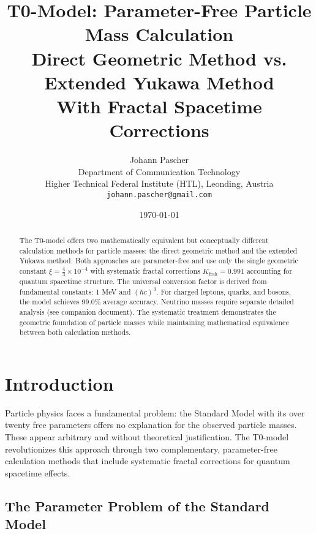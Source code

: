 \documentclass[12pt,a4paper]{article}
\newcommand{\xipar}{\xi}
\begin{document}
	
	\title{T0-Model: Parameter-Free Particle Mass Calculation \\
		\large Direct Geometric Method vs. Extended Yukawa Method \\
		\large With Fractal Spacetime Corrections}
	\author{Johann Pascher\\
		Department of Communication Technology\\
		Higher Technical Federal Institute (HTL), Leonding, Austria\\
		\texttt{johann.pascher@gmail.com}}
	\date{\today}
	
	\maketitle
	
	\begin{abstract}
		The T0-model offers two mathematically equivalent but conceptually different calculation methods for particle masses: the direct geometric method and the extended Yukawa method. Both approaches are parameter-free and use only the single geometric constant $\xipar = \frac{4}{3} \times 10^{-4}$ with systematic fractal corrections $K_{\text{frak}} = 0.991$ accounting for quantum spacetime structure. The universal conversion factor is derived from fundamental constants: 1 MeV and $(\hbar c)^3$. For charged leptons, quarks, and bosons, the model achieves 99.0\% average accuracy. Neutrino masses require separate detailed analysis (see companion document). The systematic treatment demonstrates the geometric foundation of particle masses while maintaining mathematical equivalence between both calculation methods.
	\end{abstract}
	
	\tableofcontents
	\newpage
	
	\section{Introduction}
	\label{sec:introduction}
	
	Particle physics faces a fundamental problem: the Standard Model with its over twenty free parameters offers no explanation for the observed particle masses. These appear arbitrary and without theoretical justification. The T0-model revolutionizes this approach through two complementary, parameter-free calculation methods that include systematic fractal corrections for quantum spacetime effects.
	
	\subsection{The Parameter Problem of the Standard Model}
	\label{subsec:parameter_problem}
	
\end{document}
